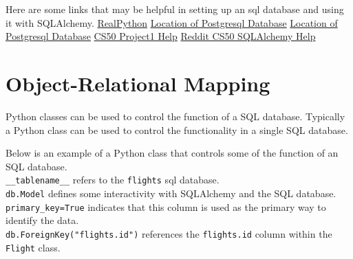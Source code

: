 \documentclass[]{book}
\begin{document}
Here are some links that may be helpful in setting up an sql database
and using it with SQLAlchemy.
\href{'https://realpython.com/flask-by-example-part-2-postgres-sqlalchemy-and-alembic/'}{RealPython}
\href{'https://stackoverflow.com/questions/1137060/where-does-postgresql-store-the-database'}{Location
of Postgresql Database}
\href{'https://stackoverflow.com/questions/26332319/finding-local-postgresql-database-url/51955545'}{Location
of Postgresql Database}
\href{'https://docs.cs50.net/web/2018/x/projects/1/project1.html'}{CS50
Project1 Help}
\href{'https://www.reddit.com/r/cs50/comments/bxjafn/sqlalchemy_error_cs50w_lecture_3/'}{Reddit
CS50 SQLAlchemy Help}

\section{Object-Relational Mapping}\label{object-relational-mapping}

Python classes can be used to control the function of a SQL database.
Typically a Python class can be used to control the functionality in a
single SQL database.

Below is an example of a Python class that controls some of the function
of an SQL database.\\
\texttt{\_\_tablename\_\_} refers to the \texttt{flights} sql
database.\\
\texttt{db.Model} defines some interactivity with SQLAlchemy and the SQL
database.\\
\texttt{primary\_key=True} indicates that this column is used as the
primary way to identify the data.\\
\texttt{db.ForeignKey("flights.id")} references the \texttt{flights.id}
column within the \texttt{Flight} class.
\end{document}
